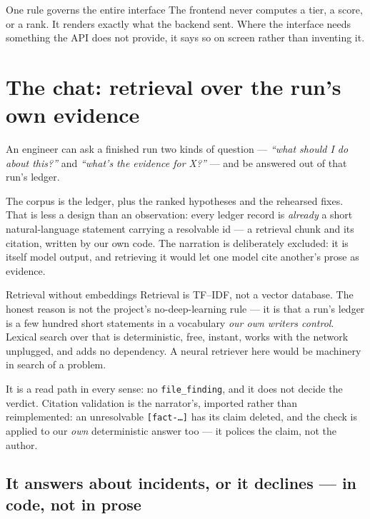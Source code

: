 \documentclass[11pt,a4paper]{article}
\newcommand{\code}[1]{\texttt{\small #1}}
\begin{document}
\begin{keybox}{One rule governs the entire interface}
The frontend never computes a tier, a score, or a rank. It renders exactly what
the backend sent. Where the interface needs something the API does not provide,
it says so on screen rather than inventing it.
\end{keybox}

\section{The chat: retrieval over the run's own evidence}
\label{sec:chat}

An engineer can ask a finished run two kinds of question --- \emph{``what should
I do about this?''} and \emph{``what's the evidence for X?''} --- and be answered
out of that run's ledger.

The corpus is the ledger, plus the ranked hypotheses and the rehearsed fixes. That
is less a design than an observation: every ledger record is \emph{already} a
short natural-language statement carrying a resolvable id --- a retrieval chunk
and its citation, written by our own code. The narration is deliberately excluded:
it is itself model output, and retrieving it would let one model cite another's
prose as evidence.

\begin{keybox}{Retrieval without embeddings}
Retrieval is TF--IDF, not a vector database. The honest reason is not the
project's no-deep-learning rule --- it is that a run's ledger is a few hundred
short statements in a vocabulary \emph{our own writers control}. Lexical search
over that is deterministic, free, instant, works with the network unplugged, and
adds no dependency. A neural retriever here would be machinery in search of a
problem.
\end{keybox}

It is a read path in every sense: no \code{file\_finding}, and it does not decide
the verdict. Citation validation is the narrator's, imported rather than
reimplemented: an unresolvable \code{[fact-\ldots]} has its claim deleted, and the
check is applied to our \emph{own} deterministic answer too --- it polices the
claim, not the author.

\subsection{It answers about incidents, or it declines --- in code, not in prose}
\end{document}
